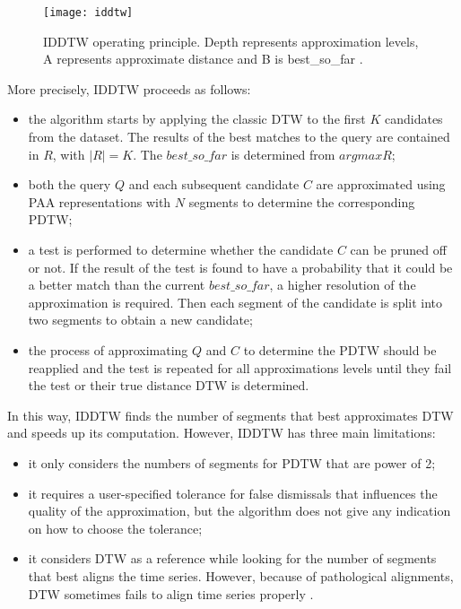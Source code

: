 \begin{figure}
\center
\texttt{[image: iddtw]}
\caption{IDDTW operating principle. Depth represents approximation levels, A represents approximate distance and B is best\_so\_far \cite{chu2002iterative}. }

\label{iddtwPrinciple}

\end{figure}

More precisely, IDDTW proceeds as follows: 

\begin{itemize}
  \item the algorithm starts by applying the classic DTW  to the first $K$ candidates from the dataset. The results of the best matches to the query are contained in $R$, with $|R|=K$. The $best\_so\_far$ is determined from $argmax{R}$;

\item both the query $Q$ and each subsequent candidate $C$ are approximated using PAA representations with  $N$  segments to determine the corresponding PDTW;

\item a test is performed to determine whether the candidate $C$ can be pruned off or not. If the result of the test is found to have a
probability that it could be a better match than the current $best\_so\_far$, a higher resolution of the approximation is required. Then each segment of the candidate is split into two segments to obtain a new candidate;

\item the process of approximating $Q$ and $C$ to determine the PDTW
should be reapplied and the test is repeated for all approximations levels until they fail the test or their true distance DTW is determined.
\end{itemize}

In this way, IDDTW finds the number of segments that best approximates DTW and speeds up its computation. However, IDDTW has three main limitations:

\begin{itemize}
  \item it only considers the numbers of segments for PDTW that are
  power of 2;
  \item it requires a user-specified tolerance for false dismissals
  that influences the quality of the approximation, but the algorithm does not give any indication on how to choose the tolerance;
  \item it considers DTW as a reference while looking for the  number of segments that best aligns the time series. However, because of pathological alignments, DTW sometimes fails to align time series properly \cite{Keogh_Pazzani_2001}.
\end{itemize}


